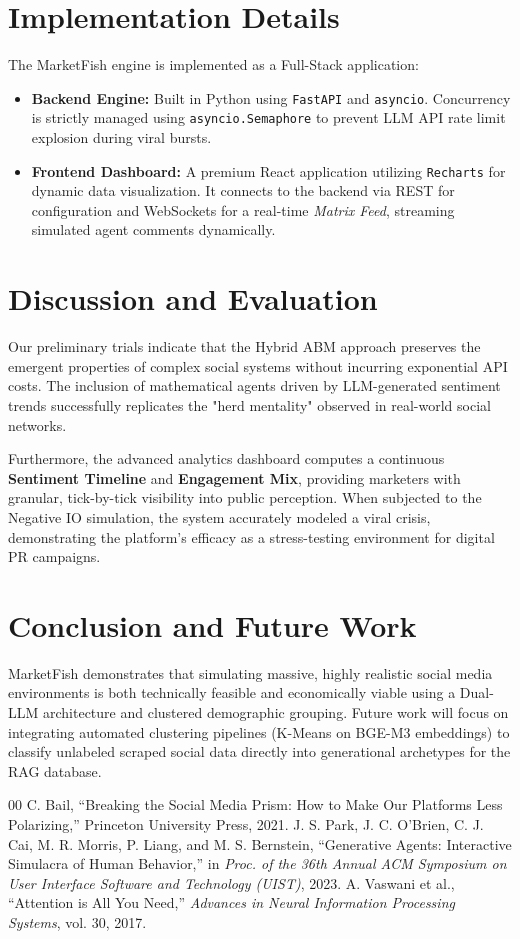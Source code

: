 \documentclass[conference]{IEEEtran}
\begin{document}
\section{Implementation Details}
The MarketFish engine is implemented as a Full-Stack application:
\begin{itemize}
    \item \textbf{Backend Engine:} Built in Python using \texttt{FastAPI} and \texttt{asyncio}. Concurrency is strictly managed using \texttt{asyncio.Semaphore} to prevent LLM API rate limit explosion during viral bursts.
    \item \textbf{Frontend Dashboard:} A premium React application utilizing \texttt{Recharts} for dynamic data visualization. It connects to the backend via REST for configuration and WebSockets for a real-time \textit{Matrix Feed}, streaming simulated agent comments dynamically. 
\end{itemize}

\section{Discussion and Evaluation}
Our preliminary trials indicate that the Hybrid ABM approach preserves the emergent properties of complex social systems without incurring exponential API costs. The inclusion of mathematical agents driven by LLM-generated sentiment trends successfully replicates the "herd mentality" observed in real-world social networks.

Furthermore, the advanced analytics dashboard computes a continuous \textbf{Sentiment Timeline} and \textbf{Engagement Mix}, providing marketers with granular, tick-by-tick visibility into public perception. When subjected to the Negative IO simulation, the system accurately modeled a viral crisis, demonstrating the platform's efficacy as a stress-testing environment for digital PR campaigns.

\section{Conclusion and Future Work}
MarketFish demonstrates that simulating massive, highly realistic social media environments is both technically feasible and economically viable using a Dual-LLM architecture and clustered demographic grouping. Future work will focus on integrating automated clustering pipelines (K-Means on BGE-M3 embeddings) to classify unlabeled scraped social data directly into generational archetypes for the RAG database.

\begin{thebibliography}{00}
 C. Bail, ``Breaking the Social Media Prism: How to Make Our Platforms Less Polarizing,'' Princeton University Press, 2021.
 J. S. Park, J. C. O'Brien, C. J. Cai, M. R. Morris, P. Liang, and M. S. Bernstein, ``Generative Agents: Interactive Simulacra of Human Behavior,'' in \textit{Proc. of the 36th Annual ACM Symposium on User Interface Software and Technology (UIST)}, 2023.
 A. Vaswani et al., ``Attention is All You Need,'' \textit{Advances in Neural Information Processing Systems}, vol. 30, 2017.
\end{thebibliography}
\end{document}
